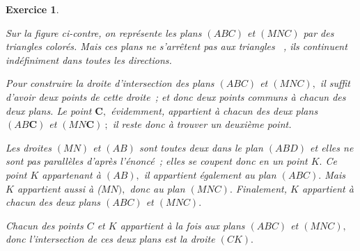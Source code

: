 \documentclass[10pt]{article}
\newtheorem{exo}{Exercice}
\begin{document}
\begin{exo}

\setlength{\columnseprule}{1pt}

\begin{multicols}{2}

\danger Sur la figure ci-contre, on représente les plans $(ABC)$ et $(MNC)$ par des triangles colorés. Mais ces plans \og ne s'arrêtent pas aux triangles \fg~{}, ils continuent indéfiniment dans toutes les directions.

\medskip

Pour construire la droite d'intersection des plans $(ABC)$ et $(MNC),$ il suffit d'avoir deux points de cette droite~; et donc deux points communs à chacun des deux plans. Le point $\mathbf{C},$ évidemment, appartient à chacun des deux plans $(AB\mathbf{C})$ et $(MN\mathbf{C})~;$ il reste donc à trouver un deuxième point.

\medskip

Les droites $(MN)$ et $(AB)$ sont toutes deux dans le plan $(ABD)$ et elles ne sont pas parallèles d'après l'énoncé~; elles se coupent donc en un point $K.$ Ce point $K$ appartenant à $(AB),$ il appartient également au plan $(ABC).$ Mais $K$ appartient aussi à ($MN),$ donc au plan $(MNC).$ Finalement, $K$ appartient à chacun des deux plans $(ABC)$ et $(MNC).$

\medskip

Chacun des points $C$ et $K$ appartient à la fois aux plans $(ABC)$ et $(MNC),$ donc l'intersection de ces deux plans est la droite $(CK).$



\end{multicols}
\end{exo}
\end{document}
